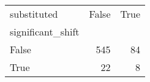 \begin{tabular}{lrr}
\toprule
substituted &  False &  True  \\
significant\_shift &        &        \\
\midrule
False             &    545 &     84 \\
True              &     22 &      8 \\
\bottomrule
\end{tabular}
